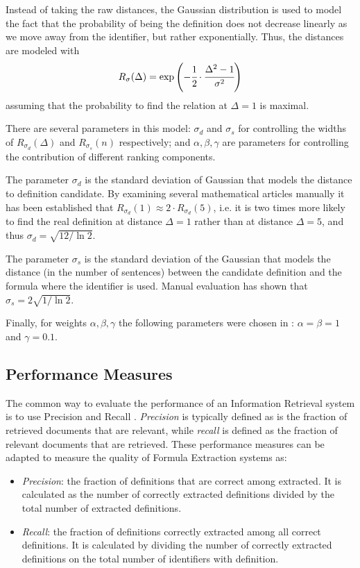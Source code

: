 Instead of taking the raw distances, the Gaussian distribution is used
to model the fact that the probability of being the definition does not
decrease linearly as we move away from the identifier, but rather
exponentially. Thus, the distances are modeled with
$$R_{\sigma}(\Delta) = \exp \left( -\cfrac{1}{2} \cdot \cfrac{\Delta^2 - 1}{\sigma^2} \right)$$
assuming that the probability to find the relation at $\Delta = 1$ is maximal. 

There are several parameters in this model: $\sigma_d$ and $\sigma_s$
for controlling the widths of $R_{\sigma_d}(\Delta)$ and $R_{\sigma_s}(n)$
respectively; and  $\alpha, \beta, \gamma$  are parameters for controlling 
the contribution of different ranking components. 

The parameter $\sigma_d$ is the standard deviation of Gaussian that
models the distance to definition candidate. By examining several mathematical
articles manually it has been established that 
$R_{\sigma_d}(1) \approx 2 \cdot R_{\sigma_d}(5)$, i.e. it is two times more 
likely to find the real definition at distance  $\Delta=1$
rather than at distance $\Delta=5$, and thus $\sigma_d = \sqrt{ 12 / \ln 2}$.

The parameter $\sigma_s$ is the standard deviation of the Gaussian that models 
the distance (in the number of sentences) between the candidate definition 
and the formula where the identifier is used. Manual evaluation has shown that 
$\sigma_s = 2 \sqrt{ 1 / \ln 2}$. 

Finally, for weights $\alpha, \beta, \gamma$ the following parameters were chosen in 
\cite{pagael2014mlp}: $\alpha = \beta = 1$ and $\gamma = 0.1$.


\subsection{Performance Measures} \label{sec:definition-evaluation}

The common way to evaluate the performance of an Information Retrieval system
is to use Precision and Recall \cite{manning2008introduction}. 
\emph{Precision} is typically defined as is the fraction of retrieved documents 
that are relevant, while \emph{recall} is defined as 
the fraction of relevant documents that are retrieved. These performance measures 
can be adapted to measure the quality of Formula Extraction systems \cite{pagael2014mlp} 
as:

\begin{itemize}
\itemsep1pt\parskip0pt
  \item \emph{Precision}: the fraction of definitions that are correct among extracted. 
        It is calculated as the number of correctly extracted definitions
        divided by the total number of extracted definitions. 
  \item \emph{Recall}: the fraction of definitions correctly extracted among all correct
        definitions. 
        It is calculated by dividing the number of correctly extracted definitions
        on the total number of identifiers with definition.
\end{itemize}


